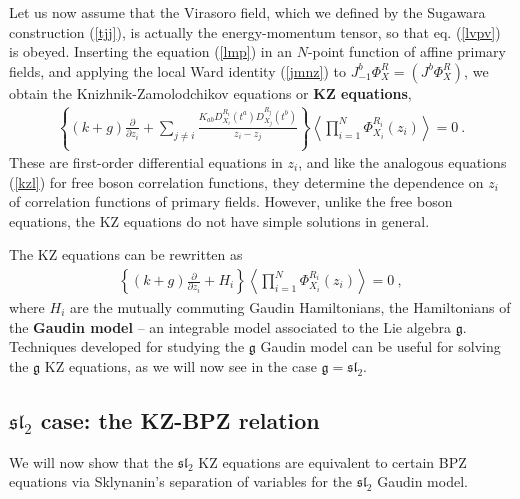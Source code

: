 \documentclass[12pt,a4paper,notitlepage]{report}
\newcommand \la {\left\langle}
\newcommand \ra {\right\rangle}
\newcommand \p {\partial}
\newcommand \pp[1] {{\frac{\p}{\p #1}}}
\numberwithin{equation}{section}
\theoremstyle{break}
\begin{document}
Let us now assume that the Virasoro field, which we defined by the Sugawara construction (\ref{tjj}), is actually the energy-momentum tensor, so that eq. (\ref{lvpv}) is obeyed. Inserting the equation (\ref{lmp}) in an $N$-point function of affine primary fields, and applying the local Ward identity (\ref{jmnz}) to $J^b_{-1}\Phi^R_X = (J^b\Phi^R_X)$, we obtain the Knizhnik-Zamolodchikov equations or \textbf{\boldmath KZ equations},
\begin{align}
 \boxed{\left\{(k+g)\pp{z_i} + \sum_{j\neq i} \frac{K_{ab}D_{X_i}^{R_i}(t^a)D_{X_j}^{R_j}(t^b)}{z_i-z_j}\right\}\la \prod_{i=1}^N \Phi^{R_i}_{X_i}(z_i)\ra  = 0}\ .
\label{kz} 
\end{align}
These are first-order differential equations in $z_i$, and like the analogous equations (\ref{kzl}) for free boson correlation functions, they determine the dependence on $z_i$ of correlation functions of primary fields. However, unlike the free boson equations, the KZ equations do not have simple solutions in general. 

The KZ equations can be rewritten as 
\begin{align}
 \left\{(k+g)\pp{z_i} + H_i \right\}\la \prod_{i=1}^N \Phi^{R_i}_{X_i}(z_i)\ra   = 0 \ ,
\label{phz}
\end{align}
where $H_i$ are the mutually commuting Gaudin Hamiltonians, the Hamiltonians of the \textbf{\boldmath Gaudin model} -- an integrable model associated to the Lie algebra $\mathfrak{g}$. Techniques developed for studying the $\mathfrak{g}$ Gaudin model can be useful for solving the $\mathfrak{g}$ KZ equations, as we will now see in the case $\mathfrak{g} = \mathfrak{sl}_2$. 


\subsection{\texorpdfstring{$\mathfrak{sl}_2$}{sl2} case: the KZ-BPZ relation} 

We will now show that the $\mathfrak{sl}_2$ KZ equations are equivalent to certain BPZ equations via Sklynanin's separation of variables for the $\mathfrak{sl}_2$ Gaudin model. 
\end{document}
